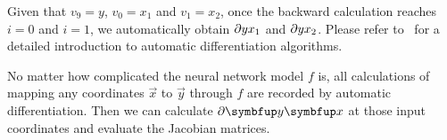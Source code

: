 Given that $v_9=y$, $v_0=x_1$ and $v_1=x_2$, once the backward calculation reaches $i=0$ and $i=1$, we automatically obtain $\pdiff{y}{x_1}$ and $\pdiff{y}{x_2}$.
Please refer to~\cite{griewank_automatic_1988} for a detailed introduction to automatic differentiation algorithms.

No matter how complicated the neural network model $f$ is, all calculations of mapping any coordinates $\vec{x}$ to $\vec{y}$ through $f$ are recorded by automatic differentiation.
Then we can calculate $\pdiff{\vec{y}}{\vec{x}}$ at those input coordinates and evaluate the Jacobian matrices.

